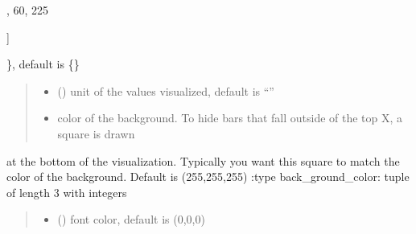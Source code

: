 \documentclass[letterpaper,10pt,english]{sphinxmanual}
\begin{document}
\begin{fulllineitems}
\begin{quote}
\begin{description}
\begin{itemize}
\end{itemize}

\end{description}\end{quote}
\begin{description}
\begin{description}
\sphinxlineitem{\{}\begin{description}
\sphinxlineitem{“United States”: {[}}
,
60,
225

\end{description}

\sphinxAtStartPar
{]}

\end{description}

\sphinxAtStartPar
\}, default is \{\}

\end{description}
\begin{quote}\begin{description}
\begin{itemize}
\item {} 
\sphinxAtStartPar
{} () \textendash{} unit of the values visualized, default is “”

\item {} 
\sphinxAtStartPar
{} \textendash{} color of the background. To hide bars that fall outside of the top X, a square is drawn

\end{itemize}

\end{description}\end{quote}

\sphinxAtStartPar
at the bottom of the visualization. Typically you want this square to match the color of the background. Default is (255,255,255)
:type back\_ground\_color: tuple of length 3 with integers
\begin{quote}\begin{description}
\begin{itemize}
\item {} 
\sphinxAtStartPar
{} () \textendash{} font color, default is (0,0,0)


\end{itemize}
\end{description}
\end{quote}
\end{fulllineitems}
\end{document}
